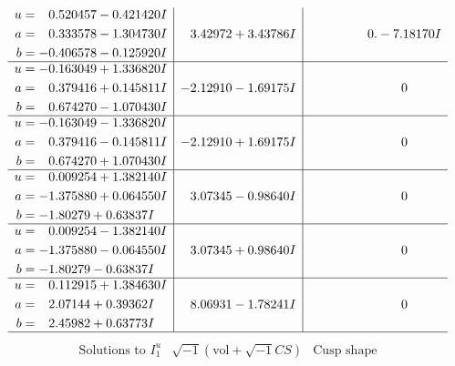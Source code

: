 \documentclass[1p]{elsarticle_modified}
\theoremstyle{definition}
\newcommand{\I}{\sqrt{-1}}
\begin{document}
$$\begin{array}{c|c|c}
\begin{aligned}
u &= \phantom{-}0.520457 - 0.421420 I \\
a &= \phantom{-}0.333578 - 1.304730 I \\
b &= -0.406578 - 0.125920 I\end{aligned}
 & \phantom{-}3.42972 + 3.43786 I & \phantom{-0.000000 } 0. - 7.18170 I \\ \hline\begin{aligned}
u &= -0.163049 + 1.336820 I \\
a &= \phantom{-}0.379416 + 0.145811 I \\
b &= \phantom{-}0.674270 - 1.070430 I\end{aligned}
 & -2.12910 - 1.69175 I & \phantom{-0.000000 } 0 \\ \hline\begin{aligned}
u &= -0.163049 - 1.336820 I \\
a &= \phantom{-}0.379416 - 0.145811 I \\
b &= \phantom{-}0.674270 + 1.070430 I\end{aligned}
 & -2.12910 + 1.69175 I & \phantom{-0.000000 } 0 \\ \hline\begin{aligned}
u &= \phantom{-}0.009254 + 1.382140 I \\
a &= -1.375880 + 0.064550 I \\
b &= -1.80279 + 0.63837 I\end{aligned}
 & \phantom{-}3.07345 - 0.98640 I & \phantom{-0.000000 } 0 \\ \hline\begin{aligned}
u &= \phantom{-}0.009254 - 1.382140 I \\
a &= -1.375880 - 0.064550 I \\
b &= -1.80279 - 0.63837 I\end{aligned}
 & \phantom{-}3.07345 + 0.98640 I & \phantom{-0.000000 } 0 \\ \hline\begin{aligned}
u &= \phantom{-}0.112915 + 1.384630 I \\
a &= \phantom{-}2.07144 + 0.39362 I \\
b &= \phantom{-}2.45982 + 0.63773 I\end{aligned}
 & \phantom{-}8.06931 - 1.78241 I & \phantom{-0.000000 } 0\\
 \hline 
 \end{array}$$\newpage$$\begin{array}{c|c|c}  
\text{Solutions to }I^u_{1}& \I (\text{vol} + \sqrt{-1}CS) & \text{Cusp shape}\\

\end{array}$$
\end{document}
